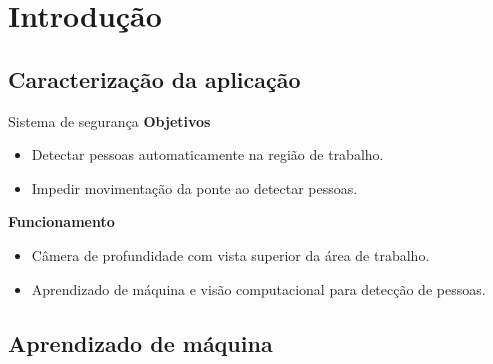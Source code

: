 \section{Introdução}

\subsection{Caracterização da aplicação}
	\begin{frame}{\insertsubsection}
	\end{frame}

	\begin{frame}{\insertsubsection}
	\end{frame}

	\begin{frame}{\insertsubsection}
	\end{frame}

	\begin{frame}{Sistema de segurança}
		\textbf{Objetivos} \\
		\begin{itemize}
			\item Detectar pessoas automaticamente na região de trabalho.
			\item Impedir movimentação da ponte ao detectar pessoas.
		\end{itemize}

		\pause

		\textbf{Funcionamento} \\
		\begin{itemize}
			\item Câmera de profundidade com vista superior da área de trabalho.
			\item Aprendizado de máquina e visão computacional para detecção de pessoas.
		\end{itemize}
	\end{frame}

\subsection{Aprendizado de máquina}

